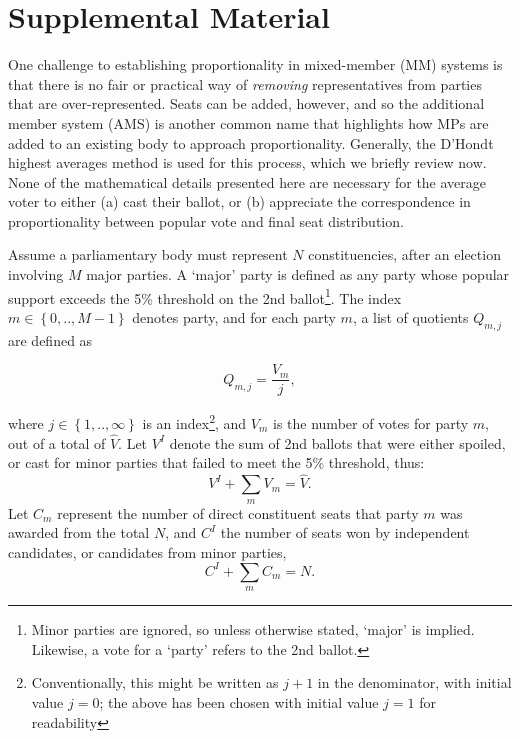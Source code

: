 
\clearpage
\renewcommand{\theequation}{S.\arabic{equation}}
\renewcommand{\thesection}{S.\arabic{section}}
\setcounter{section}{0}
\setcounter{equation}{0}

\section*{Supplemental Material}

One challenge to establishing proportionality in mixed-member (MM) systems is that there is no fair or practical way of \emph{removing} representatives from parties that are over-represented.
Seats can be added, however, and so the additional member system (AMS) is another common name that highlights how MPs are added to an existing body to approach proportionality.
Generally, the D'Hondt highest averages method is used for this process, which we briefly review now. None of the mathematical details presented here are necessary for the average voter to either (a) cast their ballot, or (b) appreciate the correspondence in proportionality between popular vote and final seat distribution.

Assume a parliamentary body must represent $N$ constituencies, after an election involving $M$ major parties. A `major' party is defined as any party whose popular support exceeds the 5\% threshold on the 2nd ballot\footnote{Minor parties are ignored, so unless otherwise stated, `major' is implied. Likewise, a vote for a `party' refers to the 2nd ballot.}.
The index  $m \in \left\{0, .., M-1\right\} $  denotes party, and for each party $m$, a list of quotients $Q_{m,j}$ are defined as

\begin{equation}
\label{eq:DhondtSupp}
Q_{m,j} = \frac{V_m}{j},
\end{equation}

where $j \in \left\{ 1,.., \infty \right\}$ is an index\footnote{Conventionally, this might be written as $j+1$ in the denominator, with initial value $j=0$; the above has been chosen with initial value $j=1$ for readability}, and  $V_m$ is the number of votes for party $m$, out of a total of $\hat{V}$. Let $V^I$ denote the sum of 2nd ballots that were either spoiled, or cast for minor parties that failed to meet the 5\% threshold, thus:
\begin{equation}
\label{eq:sum_Vm}
V^I + \sum_m V_m = \hat{V}.
\end{equation}
Let $C_m$ represent the number of direct constituent seats that party $m$ was awarded from the total $N$, and $C^I$ the number of seats won by independent candidates, or candidates from minor parties,
\begin{equation}
\label{eq:sum_Cm}
C^I + \sum_m C_m = N.
\end{equation}

